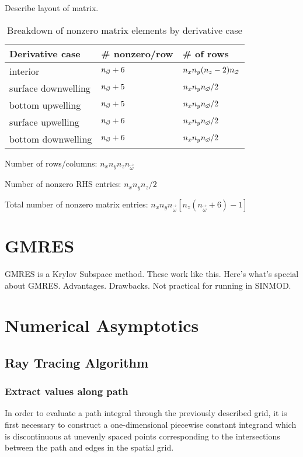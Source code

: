 Describe layout of matrix.

\begin{table}[H]
  \centering
  \begin{tabular}{p{}p{}p{}}
    \toprule
    \textbf{Derivative case} & \textbf{\# nonzero/row} & \textbf{\# of rows} \\
    \midrule
    interior & ${n_{\vec{\omega}}}+6$ & $n_xn_y(n_z-2){n_{\vec{\omega}}}$ \\
    surface downwelling & ${n_{\vec{\omega}}}+5$ & $n_xn_y{n_{\vec{\omega}}}/2$ \\
    bottom upwelling & ${n_{\vec{\omega}}}+5$ & $n_xn_y{n_{\vec{\omega}}}/2$ \\
    surface upwelling & ${n_{\vec{\omega}}}+6$ & $n_xn_y{n_{\vec{\omega}}}/2$ \\
    bottom downwelling & ${n_{\vec{\omega}}}+6$ & $n_xn_y{n_{\vec{\omega}}}/2$ \\
  \end{tabular}
  \caption{Breakdown of nonzero matrix elements by derivative case}
\end{table}

Number of rows/columns: $n_xn_yn_zn_{\vec{\omega}}$

Number of nonzero RHS entries: $n_xn_yn_z/2$

Total number of nonzero matrix entries: $n_xn_yn_{\vec{\omega}} \left[n_z(n_{\vec{\omega}}+6)-1 \right]$

\section{GMRES}
GMRES is a Krylov Subspace method. These work like this. Here's what's special
about GMRES. Advantages. Drawbacks. Not practical for running in SINMOD.

\section{Numerical Asymptotics}

\subsection{Ray Tracing Algorithm}
\subsubsection{Extract values along path}

In order to evaluate a path integral through the previously described grid, it
is first necessary to construct a one-dimensional piecewise constant integrand
which is discontinuous at unevenly spaced points corresponding to the
intersections between the path and edges in the spatial grid.

